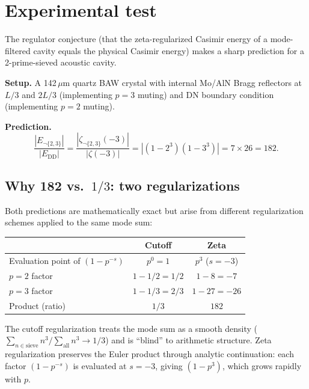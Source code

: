 \documentclass[aps,prd,twocolumn,superscriptaddress,nofootinbib]{revtex4-2}
\begin{document}
\section{Experimental test}
\label{sec:experiment}

The regulator conjecture (that the zeta-regularized Casimir energy
of a mode-filtered cavity equals the physical Casimir energy)
makes a sharp prediction for a 2-prime-sieved acoustic cavity.

\textbf{Setup.}
A 142\,$\mu$m quartz BAW crystal with internal Mo/AlN Bragg
reflectors at $L/3$ and $2L/3$ (implementing $p = 3$ muting)
and DN boundary condition (implementing $p = 2$ muting).

\textbf{Prediction.}
\begin{equation}
  \frac{|E_{\neg\{2,3\}}|}{|E_{\mathrm{DD}}|}
  = \frac{|\zeta_{\neg\{2,3\}}(-3)|}{|\zeta(-3)|}
  = |(1 - 2^3)(1 - 3^3)| = 7 \times 26 = 182.
\end{equation}

\subsection{Why 182 vs.\ $1/3$: two regularizations}

Both predictions are mathematically exact but arise from different
regularization schemes applied to the same mode sum:

\begin{center}
\begin{tabular}{lcc}
\toprule
& Cutoff & Zeta \\
\midrule
Evaluation point of $(1-p^{-s})$ & $p^0 = 1$ & $p^3$ ($s = -3$) \\
$p=2$ factor & $1 - 1/2 = 1/2$ & $1 - 8 = -7$ \\
$p=3$ factor & $1 - 1/3 = 2/3$ & $1 - 27 = -26$ \\
Product (ratio) & $1/3$ & $182$ \\
\bottomrule
\end{tabular}
\end{center}

The cutoff regularization treats the mode sum as a smooth density
($\sum_{n \in \text{sieve}} n^3 / \sum_{\text{all}} n^3 \to 1/3$)
and is ``blind'' to arithmetic structure.
Zeta regularization preserves the Euler product through analytic
continuation: each factor $(1 - p^{-s})$ is evaluated at $s = -3$,
giving $(1 - p^3)$, which grows rapidly with $p$.
\end{document}
